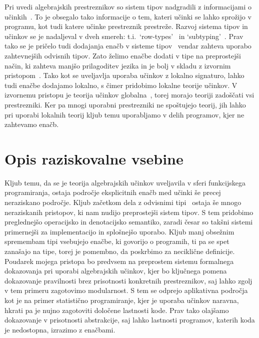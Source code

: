 \documentclass{article}
\begin{document}
Pri uvedi algebrajskih prestreznikov so sistem tipov nadgradili z informacijami o učinkih~\cite{DBLP:conf/esop/PlotkinP09}. To je obsegalo tako informacije o tem, kateri učinki se lahko sprožijo v programu, kot tudi katere učinke prestreznik prestreže. Razvoj sistema tipov in učinkov se je nadaljeval v dveh smereh: t.i.\ `row-types'~\cite{DBLP:conf/icfp/HillerstromL16} in `subtyping'~\cite{DBLP:conf/esop/SalehKPS18}. Prav tako se je pričelo tudi dodajanja enačb v sisteme tipov~\cite{DBLP:journals/pacmpl/Ahman18} vendar zahteva uporabo zahtevnejših odvisnih tipov. Zato želimo enačbe dodati v tipe na preprostejši način, ki zahteva manjšo prilagoditev jezika in je bolj v skladu z izvornim pristopom~\cite{DBLP:phd/ethos/Pretnar10}. Tako kot se uveljavlja uporaba učinkov z lokalno signaturo, lahko tudi enačbe dodajamo lokalno, s čimer pridobimo lokalne teorije učinkov. V izvornemu pristopu je teorija učinkov globalna~\cite{DBLP:conf/esop/PlotkinP09}, torej morajo teoriji zadoščati vsi prestrezniki. Ker pa mnogi uporabni prestrezniki ne spoštujejo teorij, jih lahko pri uporabi lokalnih teorij kljub temu uporabljamo v delih programov, kjer ne zahtevamo enačb.

\section*{Opis raziskovalne vsebine}

Kljub temu, da se je teorija algebrajskih učinkov uveljavila v sferi funkcijskega programiranja, ostaja področje eksplicitnih enačb med učinki še precej neraziskano področje. Kljub začetkom dela z odvisnimi tipi~\cite{DBLP:journals/pacmpl/Ahman18} ostaja še mnogo neraziskanih pristopov, ki nam nudijo preprostejši sistem tipov. S tem pridobimo preglednejšo operacijsko in denotacijsko semantiko, zaradi česar so takšni sistemi primernejši za implementacijo in splošnejšo uporabo. Kljub manj obsežnim spremembam tipi vsebujejo enačbe, ki govorijo o programih, ti pa se spet zanašajo na tipe, torej je pomembno, da poskrbimo za neciklične definicije. Poudarek mojega pristopa bo predvsem na preprostem sistemu formalnega dokazovanja pri uporabi algebrajskih učinkov, kjer bo ključnega pomena dokazovanje pravilnosti brez prisotnosti konkretnih prestreznikov, saj lahko zgolj v tem primeru zagotovimo modularnost. S tem se odprejo aplikativna področja kot je na primer statistično programiranje, kjer je uporaba učinkov naravna, hkrati pa je nujno zagotoviti določene lastnosti kode. Prav tako olajšamo dokazovanje v prisotnosti abstrakcije, saj lahko lastnosti programov, katerih koda je nedostopna, izrazimo z enačbami.
\end{document}
